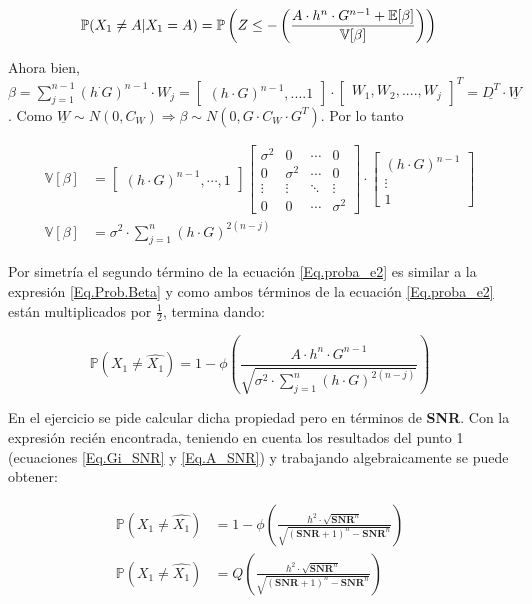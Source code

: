 			\begin{equation}
				\mathbb{P}(X_1 \neq A | X_1 = A) = \mathbb{P} \left( Z\leq - \left(\frac{A \cdot h^n \cdot G^{n-1} + \mathbb{E}[\beta]}{\mathbb{V}[\beta]} \right) \right)
				\label{Eq.Prob.Beta} \\
			\end{equation}

\indent Ahora bien, $\beta = \sum_{j=1}^{n-1} (h ^\cdot G)^{n-1} \cdot W_j = \begin{bmatrix} (h \cdot G)^{n-1}, .... 1 \end{bmatrix} \cdot \begin{bmatrix} W_1, W_2, ...., W_j \end{bmatrix} ^T = \underline{D^T} \cdot \underline{W}$. Como $\underline{W} \sim N(0,C_W) \Rightarrow \beta \sim N(0, G \cdot C_W \cdot G^T)$. Por lo tanto

				\begin{align*}
				\mathbb{V}[\beta] &= \begin{bmatrix} (h \cdot G)^{n-1}, \cdots ,1 \end{bmatrix} \begin{bmatrix} \sigma ^2 & 0 & \cdots & 0 \\ 0 & \sigma ^2 & \cdots & 0 \\ \vdots & \vdots & \ddots & \vdots \\ 0 & 0 & \cdots & \sigma ^2\end{bmatrix} \cdot \begin{bmatrix} (h \cdot G)^{n-1}\\ \vdots \\ 1 \end{bmatrix} \\
				\mathbb{V}[\beta] &= \sigma ^2 \cdot \sum_{j=1}^{n}(h \cdot G)^{2(n-j)}
				\end{align*}

\indent Por simetría el segundo término de la ecuación \ref{Eq.proba_e2} es similar a la expresión \ref{Eq.Prob.Beta} y como ambos términos de la ecuación \ref{Eq.proba_e2} están multiplicados por $\frac{1}{2}$, termina dando:

				\begin{equation}
				\mathbb{P}(X_1 \neq \widehat{X_1}) = 1 - \phi \left( \frac{A \cdot h^n \cdot G^{n-1}}{\sqrt{\sigma ^2 \cdot \sum_{j=1}^{n} (h \cdot G)^{2(n-j)}}}	 \right) 
				\end{equation}		

\indent En el ejercicio se pide calcular dicha propiedad pero en términos de \textbf{SNR}. Con la expresión recién encontrada, teniendo en cuenta los resultados del punto 1 (ecuaciones \ref{Eq.Gi_SNR} y \ref{Eq.A_SNR}) y trabajando algebraicamente se puede obtener:

				\begin{align}
					\mathbb{P}(X_1 \neq \widehat{X_1}) &= 1 - \phi \left( \frac{h^2 \cdot \sqrt{\textbf{SNR}^n}}{\sqrt{(\textbf{SNR}+1)^n -\textbf{SNR}^n}} \right)\\
					 \mathbb{P}(X_1 \neq \widehat{X_1}) &= Q \left( \frac{h^2 \cdot \sqrt{\textbf{SNR}^n}}{\sqrt{(\textbf{SNR}+1)^n -\textbf{SNR}^n}} \right)
				\label{Eq.prob_SNR}					
				\end{align} 	